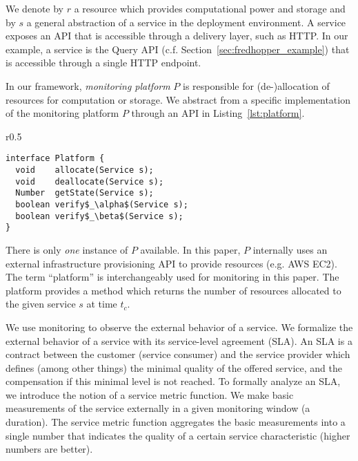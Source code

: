 We denote by $r$ a resource which provides computational power and storage
and by $s$ a general abstraction of a service in the deployment environment. 
A service exposes an API that is accessible through a delivery layer, such as HTTP.
In our example, a service is the Query API (c.f. Section~\ref{sec:fredhopper_example}) that is accessible through a single HTTP endpoint.

In our framework, 
\emph{monitoring platform}  $P$ is responsible for (de-)allocation of resources for computation or storage.
We abstract from a specific implementation of the monitoring platform $P$ through an API in Listing~\ref{lst:platform}. 
% 
\lstset{language=java,aboveskip=-20pt,belowskip=-20pt}
\begin{wrapfigure}{r}{0.5\textwidth}
\vspace{-15pt}
\begin{center}
\begin{lstlisting}[mathescape,caption=Platform API,label=lst:platform]
interface Platform {
  void    allocate(Service s);
  void    deallocate(Service s);
  Number  getState(Service s);
  boolean verify$_\alpha$(Service s);
  boolean verify$_\beta$(Service s);
}
\end{lstlisting}
\end{center}   
\vspace{-15pt}
\end{wrapfigure}
\lstset{mathescape=false}
% 
There is only \emph{one} instance of $P$ available.
In this paper, $P$ internally uses an external infrastructure provisioning API to provide resources (e.g. AWS EC2).
The term ``platform'' is interchangeably used for monitoring in this paper.
The platform provides a method  which returns
the number of resources allocated to the given service $s$ at time $t_c$.

We use monitoring to observe the external behavior of a service.
We formalize the external behavior of a service with its service-level agreement (SLA).
An SLA is a contract between the customer (service consumer) and the service provider
which defines (among other things) the minimal quality of the offered service,
and the compensation if this minimal level is not reached.
To formally analyze an SLA, we introduce the notion of a service metric function.
We make basic measurements of the service externally in a given monitoring window (a duration).
The service metric function aggregates the basic measurements into a single number
that indicates the quality of a certain service characteristic (higher numbers are better).
%

